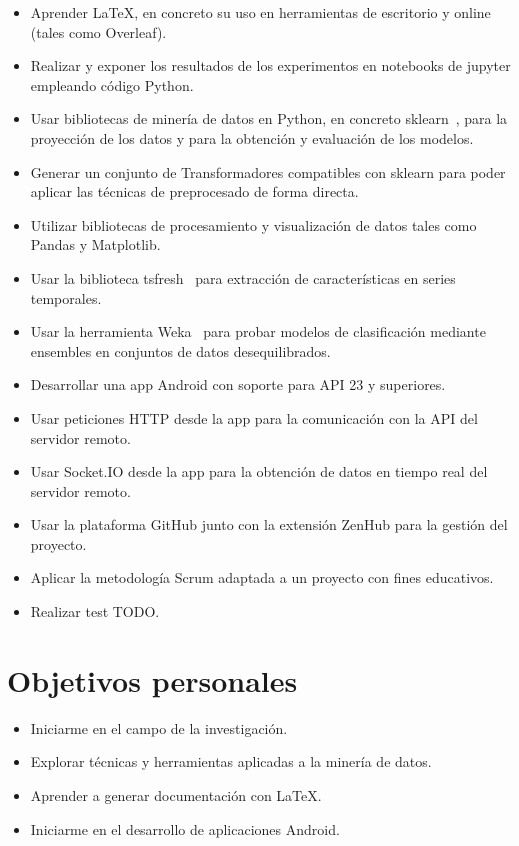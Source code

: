 \begin{itemize}
	\item Aprender \LaTeX{}, en concreto su uso en herramientas de escritorio y online (tales como Overleaf).  
	\item Realizar y exponer los resultados de los experimentos en notebooks de jupyter empleando código Python. 
	\item Usar bibliotecas de minería de datos en Python, en concreto sklearn~\cite{scikit-learn}, para la proyección de los datos y para la obtención y evaluación de los modelos.
	\item Generar un conjunto de Transformadores compatibles con sklearn para poder aplicar las técnicas de preprocesado de forma directa.
	\item Utilizar bibliotecas de procesamiento y visualización de datos tales como Pandas y Matplotlib.  
	\item Usar la biblioteca tsfresh~\cite{christ2018time} para extracción de características en series temporales. 
	\item Usar la herramienta Weka~\cite{hall2009weka} para probar modelos de clasificación mediante ensembles en conjuntos de datos desequilibrados. 
	\item Desarrollar una app Android con soporte para API 23 y superiores. 
	\item Usar peticiones HTTP desde la app para la comunicación con la API del servidor remoto. 
	\item Usar Socket.IO desde la app para la obtención de datos en tiempo real del servidor remoto.
	\item Usar la plataforma GitHub junto con la extensión ZenHub para la gestión del proyecto. 
	\item Aplicar la metodología Scrum adaptada a un proyecto con fines educativos. 
	\item Realizar test TODO. 
	
	
\end{itemize}

\section{Objetivos personales}

\begin{itemize}
	\item Iniciarme en el campo de la investigación. 
	\item Explorar técnicas y herramientas aplicadas a la minería de datos. 
	\item Aprender a generar documentación con \LaTeX{}. 
	\item Iniciarme en el desarrollo de aplicaciones Android. 
\end{itemize}
